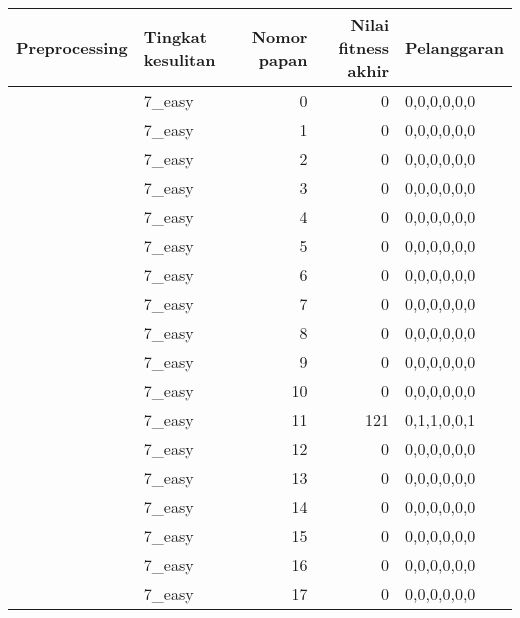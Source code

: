 \begin{tabular}{llrrl}
\hline
 Preprocessing   & Tingkat kesulitan   &   Nomor papan &   Nilai fitness akhir & Pelanggaran   \\
\hline
 [True, False]   & 7\_easy              &             0 &                     0 & 0,0,0,0,0,0   \\
 [True, False]   & 7\_easy              &             1 &                     0 & 0,0,0,0,0,0   \\
 [True, False]   & 7\_easy              &             2 &                     0 & 0,0,0,0,0,0   \\
 [True, False]   & 7\_easy              &             3 &                     0 & 0,0,0,0,0,0   \\
 [True, False]   & 7\_easy              &             4 &                     0 & 0,0,0,0,0,0   \\
 [True, False]   & 7\_easy              &             5 &                     0 & 0,0,0,0,0,0   \\
 [True, False]   & 7\_easy              &             6 &                     0 & 0,0,0,0,0,0   \\
 [True, False]   & 7\_easy              &             7 &                     0 & 0,0,0,0,0,0   \\
 [True, False]   & 7\_easy              &             8 &                     0 & 0,0,0,0,0,0   \\
 [True, False]   & 7\_easy              &             9 &                     0 & 0,0,0,0,0,0   \\
 [True, False]   & 7\_easy              &            10 &                     0 & 0,0,0,0,0,0   \\
 [True, False]   & 7\_easy              &            11 &                   121 & 0,1,1,0,0,1   \\
 [True, False]   & 7\_easy              &            12 &                     0 & 0,0,0,0,0,0   \\
 [True, False]   & 7\_easy              &            13 &                     0 & 0,0,0,0,0,0   \\
 [True, False]   & 7\_easy              &            14 &                     0 & 0,0,0,0,0,0   \\
 [True, False]   & 7\_easy              &            15 &                     0 & 0,0,0,0,0,0   \\
 [True, False]   & 7\_easy              &            16 &                     0 & 0,0,0,0,0,0   \\
 [True, False]   & 7\_easy              &            17 &                     0 & 0,0,0,0,0,0   \\

\end{tabular}
